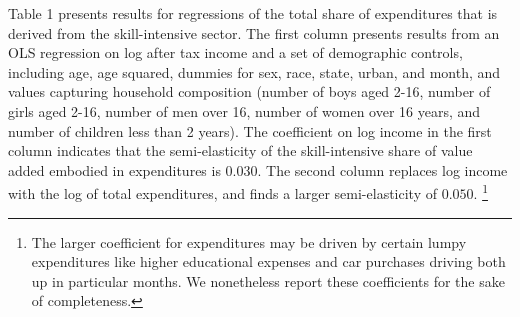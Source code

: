\documentclass[12pt,english]{article}
\begin{document}
Table 1 presents results for regressions of the total share of expenditures
that is derived from the skill-intensive sector. The first column presents
results from an OLS regression on log after tax income and a set of
demographic controls, including age, age squared, dummies for sex, race,
state, urban, and month, and values capturing household composition (number
of boys aged 2-16, number of girls aged 2-16, number of men over 16, number
of women over 16 years, and number of children less than 2 years). The
coefficient on log income in the first column indicates that the
semi-elasticity of the skill-intensive share of value added embodied in
expenditures is $0.030$. The second column replaces log income with the log
of total expenditures, and finds a larger semi-elasticity of $0.050$.%
\footnote{%
The larger coefficient for expenditures may be driven by certain lumpy
expenditures like higher educational expenses and car purchases driving both
up in particular months. We nonetheless report these coefficients for the
sake of completeness.}
\end{document}
